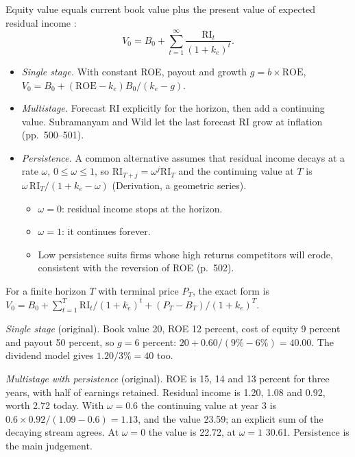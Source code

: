 \begin{qfmethod}\label{meth:residual-income-valuation}
 Equity value equals current book value plus the present value of expected residual income \citep[pp.~42, 499]{financial-statement-analysis-2009}:
\[ V_0=B_0+\sum_{t=1}^{\infty}\frac{\mathrm{RI}_t}{(1+k_e)^t}. \]
\begin{itemize}
\item \emph{Single stage.} With constant ROE, payout and growth $g=b\times\mathrm{ROE}$, $V_0=B_0+(\mathrm{ROE}-k_e)B_0/(k_e-g)$.
\item \emph{Multistage.} Forecast RI explicitly for the horizon, then add a continuing value. Subramanyam and Wild let the last forecast RI grow at inflation (pp.~500--501).
\item \emph{Persistence.} A common alternative assumes that residual income decays at a rate $\omega$, $0\le\omega\le1$, so $\mathrm{RI}_{T+j}=\omega^j\mathrm{RI}_T$ and the continuing value at $T$ is $\omega\,\mathrm{RI}_T/(1+k_e-\omega)$ (Derivation, a geometric series).
\begin{itemize}
\item $\omega=0$: residual income stops at the horizon.
\item $\omega=1$: it continues forever.
\item Low persistence suits firms whose high returns competitors will erode, consistent with the reversion of ROE (p.~502).
\end{itemize}
\end{itemize}
For a finite horizon $T$ with terminal price $P_T$, the exact form is $V_0=B_0+\sum_{t=1}^T\mathrm{RI}_t/(1+k_e)^t+(P_T-B_T)/(1+k_e)^T$.

 \emph{Single stage} (original). Book value 20, ROE 12 percent, cost of equity 9 percent and payout 50 percent, so $g=6$ percent: $20+0.60/(9\%-6\%)=40.00$. The dividend model gives $1.20/3\%=40$ too.

\emph{Multistage with persistence} (original). ROE is 15, 14 and 13 percent for three years, with half of earnings retained. Residual income is 1.20, 1.08 and 0.92, worth 2.72 today. With $\omega=0.6$ the continuing value at year 3 is $0.6\times0.92/(1.09-0.6)=1.13$, and the value 23.59; an explicit sum of the decaying stream agrees. At $\omega=0$ the value is 22.72, at $\omega=1$ 30.61. Persistence is the main judgement.


\end{qfmethod}
